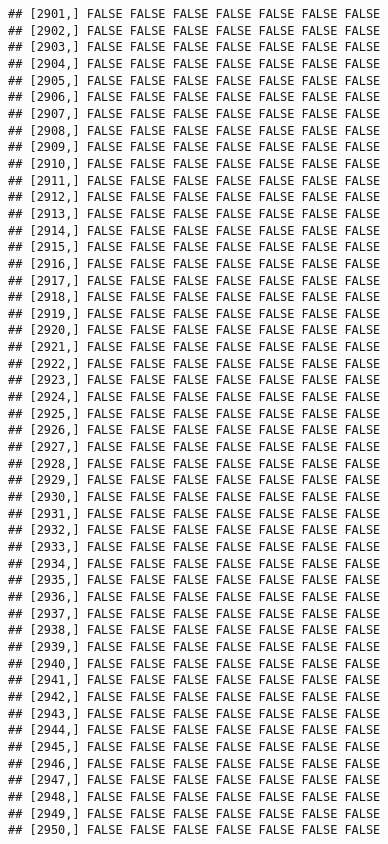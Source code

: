 \documentclass[
]{article}
\begin{document}
\begin{verbatim}
## [2901,] FALSE FALSE FALSE FALSE FALSE FALSE FALSE
## [2902,] FALSE FALSE FALSE FALSE FALSE FALSE FALSE
## [2903,] FALSE FALSE FALSE FALSE FALSE FALSE FALSE
## [2904,] FALSE FALSE FALSE FALSE FALSE FALSE FALSE
## [2905,] FALSE FALSE FALSE FALSE FALSE FALSE FALSE
## [2906,] FALSE FALSE FALSE FALSE FALSE FALSE FALSE
## [2907,] FALSE FALSE FALSE FALSE FALSE FALSE FALSE
## [2908,] FALSE FALSE FALSE FALSE FALSE FALSE FALSE
## [2909,] FALSE FALSE FALSE FALSE FALSE FALSE FALSE
## [2910,] FALSE FALSE FALSE FALSE FALSE FALSE FALSE
## [2911,] FALSE FALSE FALSE FALSE FALSE FALSE FALSE
## [2912,] FALSE FALSE FALSE FALSE FALSE FALSE FALSE
## [2913,] FALSE FALSE FALSE FALSE FALSE FALSE FALSE
## [2914,] FALSE FALSE FALSE FALSE FALSE FALSE FALSE
## [2915,] FALSE FALSE FALSE FALSE FALSE FALSE FALSE
## [2916,] FALSE FALSE FALSE FALSE FALSE FALSE FALSE
## [2917,] FALSE FALSE FALSE FALSE FALSE FALSE FALSE
## [2918,] FALSE FALSE FALSE FALSE FALSE FALSE FALSE
## [2919,] FALSE FALSE FALSE FALSE FALSE FALSE FALSE
## [2920,] FALSE FALSE FALSE FALSE FALSE FALSE FALSE
## [2921,] FALSE FALSE FALSE FALSE FALSE FALSE FALSE
## [2922,] FALSE FALSE FALSE FALSE FALSE FALSE FALSE
## [2923,] FALSE FALSE FALSE FALSE FALSE FALSE FALSE
## [2924,] FALSE FALSE FALSE FALSE FALSE FALSE FALSE
## [2925,] FALSE FALSE FALSE FALSE FALSE FALSE FALSE
## [2926,] FALSE FALSE FALSE FALSE FALSE FALSE FALSE
## [2927,] FALSE FALSE FALSE FALSE FALSE FALSE FALSE
## [2928,] FALSE FALSE FALSE FALSE FALSE FALSE FALSE
## [2929,] FALSE FALSE FALSE FALSE FALSE FALSE FALSE
## [2930,] FALSE FALSE FALSE FALSE FALSE FALSE FALSE
## [2931,] FALSE FALSE FALSE FALSE FALSE FALSE FALSE
## [2932,] FALSE FALSE FALSE FALSE FALSE FALSE FALSE
## [2933,] FALSE FALSE FALSE FALSE FALSE FALSE FALSE
## [2934,] FALSE FALSE FALSE FALSE FALSE FALSE FALSE
## [2935,] FALSE FALSE FALSE FALSE FALSE FALSE FALSE
## [2936,] FALSE FALSE FALSE FALSE FALSE FALSE FALSE
## [2937,] FALSE FALSE FALSE FALSE FALSE FALSE FALSE
## [2938,] FALSE FALSE FALSE FALSE FALSE FALSE FALSE
## [2939,] FALSE FALSE FALSE FALSE FALSE FALSE FALSE
## [2940,] FALSE FALSE FALSE FALSE FALSE FALSE FALSE
## [2941,] FALSE FALSE FALSE FALSE FALSE FALSE FALSE
## [2942,] FALSE FALSE FALSE FALSE FALSE FALSE FALSE
## [2943,] FALSE FALSE FALSE FALSE FALSE FALSE FALSE
## [2944,] FALSE FALSE FALSE FALSE FALSE FALSE FALSE
## [2945,] FALSE FALSE FALSE FALSE FALSE FALSE FALSE
## [2946,] FALSE FALSE FALSE FALSE FALSE FALSE FALSE
## [2947,] FALSE FALSE FALSE FALSE FALSE FALSE FALSE
## [2948,] FALSE FALSE FALSE FALSE FALSE FALSE FALSE
## [2949,] FALSE FALSE FALSE FALSE FALSE FALSE FALSE
## [2950,] FALSE FALSE FALSE FALSE FALSE FALSE FALSE

\end{verbatim}
\end{document}
